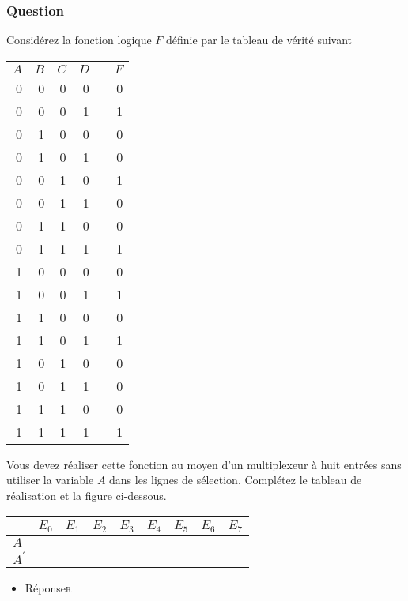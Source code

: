 \documentclass[11pt]{article}
\begin{document}
\subsubsection*{Question}
\label{sec:org1c8dd7d}
Considérez la fonction logique \(F\) définie par le tableau de vérité suivant
\begin{center}
\begin{tabular}{rrrrlr}
\(A\) & \(B\) & \(C\) & \(D\) &  & \(F\)\\
\hline
0 & 0 & 0 & 0 &  & 0\\
0 & 0 & 0 & 1 &  & 1\\
0 & 1 & 0 & 0 &  & 0\\
0 & 1 & 0 & 1 &  & 0\\
0 & 0 & 1 & 0 &  & 1\\
0 & 0 & 1 & 1 &  & 0\\
0 & 1 & 1 & 0 &  & 0\\
0 & 1 & 1 & 1 &  & 1\\
1 & 0 & 0 & 0 &  & 0\\
1 & 0 & 0 & 1 &  & 1\\
1 & 1 & 0 & 0 &  & 0\\
1 & 1 & 0 & 1 &  & 1\\
1 & 0 & 1 & 0 &  & 0\\
1 & 0 & 1 & 1 &  & 0\\
1 & 1 & 1 & 0 &  & 0\\
1 & 1 & 1 & 1 &  & 1\\
\end{tabular}
\end{center}
Vous devez réaliser cette fonction au moyen d'un multiplexeur à huit
entrées sans utiliser la variable \(A\) dans les lignes de
sélection. Complétez le tableau de réalisation et la figure
ci-dessous.
\begin{center}
\begin{tabular}{lllllllll}
 & \(E_0\) & \(E_1\) & \(E_2\) & \(E_3\) & \(E_4\) & \(E_5\) & \(E_6\) & \(E_7\)\\
\hline
\(A\) &  &  &  &  &  &  &  & \\
\(A^\prime\) &  &  &  &  &  &  &  & \\
\end{tabular}
\end{center}
\begin{center}

\end{center}

\begin{itemize}
\item Réponse\hfill{}\textsc{r}
\label{sec:orgf0c4b7e}
\end{itemize}
\end{document}
